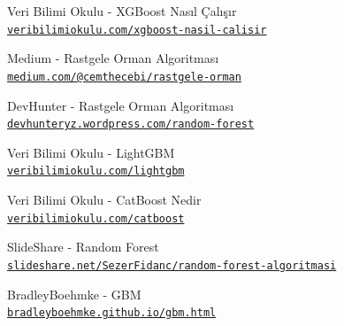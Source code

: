 \documentclass[conference]{IEEEtran}
\begin{document}
\begin{thebibliography}{16}
Veri Bilimi Okulu  - XGBoost Nasıl Çalışır
\\\texttt{\href{https://www.veribilimiokulu.com/xgboost-nasil-calisir/}{\nolinkurl{veribilimiokulu.com/xgboost-nasil-calisir}}}

Medium - Rastgele Orman Algoritması
\\\texttt{\href{https://medium.com/@cemthecebi/rastgele-orman-algoritması-1600ca4f4784}{\nolinkurl{medium.com/@cemthecebi/rastgele-orman}}}

DevHunter - Rastgele Orman Algoritması
\\\texttt{\href{https://devhunteryz.wordpress.com/2018/09/20/rastgele-ormanrandom-forest-algoritmasi/comment-page-1/}{\nolinkurl{devhunteryz.wordpress.com/random-forest}}}

Veri Bilimi Okulu - LightGBM
\\\texttt{\href{https://www.veribilimiokulu.com/lightgbm/}{\nolinkurl{veribilimiokulu.com/lightgbm}}}

Veri Bilimi Okulu - CatBoost Nedir
\\\texttt{\href{https://www.veribilimiokulu.com/catboost-nedir-diger-boosting-algoritmalarindan-farki-nelerdir/}{\nolinkurl{veribilimiokulu.com/catboost}}}

SlideShare - Random Forest
\\\texttt{\href{https://www.slideshare.net/SezerFidanc/random-forest-algoritmas}{\nolinkurl{slideshare.net/SezerFidanc/random-forest-algoritmasi}}}

BradleyBoehmke - GBM
\\\texttt{\href{https://bradleyboehmke.github.io/HOML/gbm.html}{\nolinkurl{bradleyboehmke.github.io/gbm.html}}}

\end{thebibliography}
\end{document}
